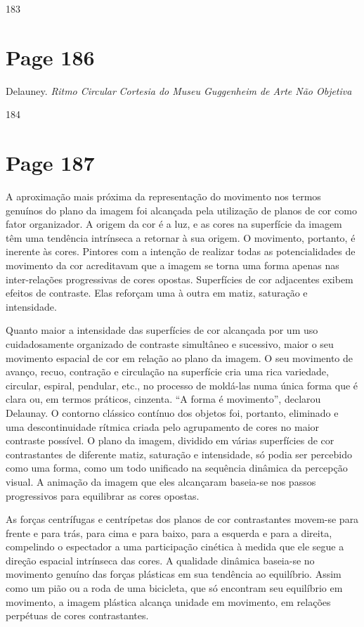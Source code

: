 \documentclass[a4paper]{article}
\begin{document}
183

\newpage
\section*{Page 186}

Delauney. \textit{Ritmo Circular} \textit{Cortesia do Museu Guggenheim de Arte Não Objetiva}

184

\newpage
\section*{Page 187}

A aproximação mais próxima da representação do movimento nos termos genuínos do plano da imagem foi alcançada pela utilização de planos de cor como fator organizador. A origem da cor é a luz, e as cores na superfície da imagem têm uma tendência intrínseca a retornar à sua origem. O movimento, portanto, é inerente às cores. Pintores com a intenção de realizar todas as potencialidades de movimento da cor acreditavam que a imagem se torna uma forma apenas nas inter-relações progressivas de cores opostas. Superfícies de cor adjacentes exibem efeitos de contraste. Elas reforçam uma à outra em matiz, saturação e intensidade.

Quanto maior a intensidade das superfícies de cor alcançada por um uso cuidadosamente organizado de contraste simultâneo e sucessivo, maior o seu movimento espacial de cor em relação ao plano da imagem. O seu movimento de avanço, recuo, contração e circulação na superfície cria uma rica variedade, circular, espiral, pendular, etc., no processo de moldá-las numa única forma que é clara ou, em termos práticos, cinzenta. ``A forma é movimento'', declarou Delaunay. O contorno clássico contínuo dos objetos foi, portanto, eliminado e uma descontinuidade rítmica criada pelo agrupamento de cores no maior contraste possível. O plano da imagem, dividido em várias superfícies de cor contrastantes de diferente matiz, saturação e intensidade, só podia ser percebido como uma forma, como um todo unificado na sequência dinâmica da percepção visual. A animação da imagem que eles alcançaram baseia-se nos passos progressivos para equilibrar as cores opostas.

As forças centrífugas e centrípetas dos planos de cor contrastantes movem-se para frente e para trás, para cima e para baixo, para a esquerda e para a direita, compelindo o espectador a uma participação cinética à medida que ele segue a direção espacial intrínseca das cores. A qualidade dinâmica baseia-se no movimento genuíno das forças plásticas em sua tendência ao equilíbrio. Assim como um pião ou a roda de uma bicicleta, que só encontram seu equilíbrio em movimento, a imagem plástica alcança unidade em movimento, em relações perpétuas de cores contrastantes.
\end{document}
